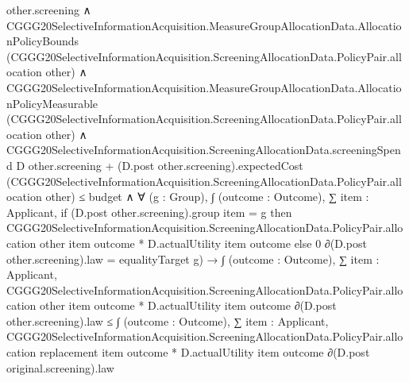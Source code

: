 \documentclass[10pt]{article}
\begin{document}
\begin{ReviewVerbatim}
                                          other.screening ∧
                                        CGGG20SelectiveInformationAcquisition.MeasureGroupAllocationData.AllocationPolicyBounds
                                            (CGGG20SelectiveInformationAcquisition.ScreeningAllocationData.PolicyPair.allocation
                                              other) ∧
                                          CGGG20SelectiveInformationAcquisition.MeasureGroupAllocationData.AllocationPolicyMeasurable
                                              (CGGG20SelectiveInformationAcquisition.ScreeningAllocationData.PolicyPair.allocation
                                                other) ∧
                                            CGGG20SelectiveInformationAcquisition.ScreeningAllocationData.screeningSpend
                                                    D other.screening +
                                                  (D.post other.screening).expectedCost
                                                    (CGGG20SelectiveInformationAcquisition.ScreeningAllocationData.PolicyPair.allocation
                                                      other) ≤
                                                budget ∧
                                              ∀ (g : Group),
                                                ∫ (outcome : Outcome),
                                                    ∑ item : Applicant,
                                                      if (D.post other.screening).group item = g then
                                                        CGGG20SelectiveInformationAcquisition.ScreeningAllocationData.PolicyPair.allocation
                                                            other item outcome *
                                                          D.actualUtility item outcome
                                                      else 0 ∂(D.post other.screening).law =
                                                  equalityTarget g) →
                                      ∫ (outcome : Outcome),
                                          ∑ item : Applicant,
                                            CGGG20SelectiveInformationAcquisition.ScreeningAllocationData.PolicyPair.allocation
                                                other item outcome *
                                              D.actualUtility item outcome ∂(D.post other.screening).law ≤
                                        ∫ (outcome : Outcome),
                                          ∑ item : Applicant,
                                            CGGG20SelectiveInformationAcquisition.ScreeningAllocationData.PolicyPair.allocation
                                                replacement item outcome *
                                              D.actualUtility item outcome ∂(D.post original.screening).law
\end{ReviewVerbatim}
\end{document}
